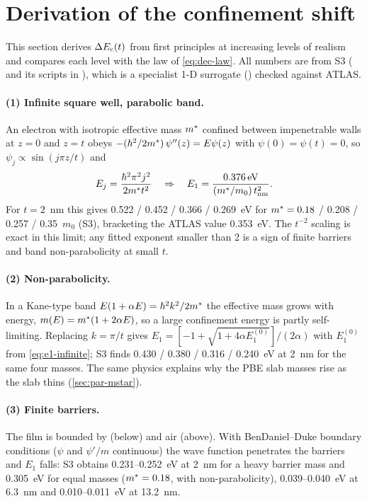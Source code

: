 \section{Derivation of the confinement shift}
\label{sec:der-confinement}

This section derives $\Delta E_{\mathrm{c}}(t)$ from first principles at increasing levels of realism and compares each level
with the law of \cref{eq:dec-law}. All numbers are from S3 ( and its scripts
in ), which is a specialist 1-D surrogate (\evSURR) checked against ATLAS.

\paragraph{(1) Infinite square well, parabolic band.}
An electron with isotropic effective mass $m^{*}$ confined between impenetrable walls at $z=0$ and $z=t$
obeys $-(\hbar^2/2m^{*})\,\psi''(z) = E\psi(z)$ with $\psi(0)=\psi(t)=0$, so $\psi_j \propto \sin(j\pi z/t)$ and
\begin{equation}
  E_j = \frac{\hbar^2\pi^2 j^2}{2m^{*} t^2}
  \quad\Rightarrow\quad
  E_1 = \frac{\SI{0.376}{eV}}{(m^{*}/m_0)\,t_{\mathrm{nm}}^2}.
  \label{eq:e1-infinite}
\end{equation}
For $t = 2$~nm this gives 0.522 / 0.452 / 0.366 / 0.269~eV for $m^{*} = 0.18$ / 0.208 / 0.257 / 0.35~$m_0$
(S3), bracketing the ATLAS value 0.353~eV. The $t^{-2}$ scaling is exact in this limit; any fitted exponent
smaller than 2 is a sign of finite barriers and band non-parabolicity at small $t$.

\paragraph{(2) Non-parabolicity.}
In a Kane-type band $E(1+\alpha E) = \hbar^2k^2/2m^{*}$ the effective mass grows with energy,
$m(E) = m^{*}(1+2\alpha E)$, so a large confinement energy is partly self-limiting. Replacing $k = \pi/t$ gives
$E_1 = [-1+\sqrt{1+4\alpha E_1^{(0)}}]/(2\alpha)$ with $E_1^{(0)}$ from \cref{eq:e1-infinite}; S3 finds
0.430 / 0.380 / 0.316 / 0.240~eV at 2~nm for the same four masses. The same physics explains why the PBE slab
masses rise as the slab thins (\cref{sec:par-mstar}).

\paragraph{(3) Finite barriers.}
The film is bounded by \AlO{} (below) and air (above). With BenDaniel--Duke boundary conditions
($\psi$ and $\psi'/m$ continuous) the wave function penetrates the barriers and $E_1$ falls: S3 obtains
0.231--0.252~eV at 2~nm for a heavy barrier mass and 0.305~eV for equal masses ($m^{*} = 0.18$, with
non-parabolicity), 0.039--0.040~eV at 6.3~nm and 0.010--0.011~eV at 13.2~nm.

